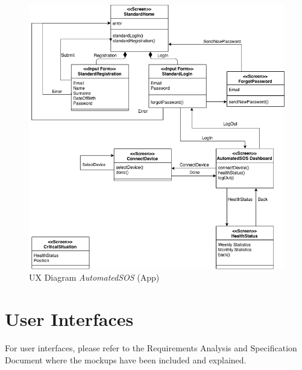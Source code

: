 \begin{figure}[H]
  \begin{center}
  	\includegraphics[width=0.68\paperwidth]{./img/UXDiagram/UX_Diagram_AutomatedSOS_App.png}
    \hspace{0.05\linewidth}
    \centering
    \caption{UX Diagram \textit{AutomatedSOS} (App)}
		\label{img:AutomatedSOSApp}
    \end{center}
\end{figure}

\section{User Interfaces}
For user interfaces, please refer to the Requirements Analysis and Specification Document where the mockups have been included and explained.
